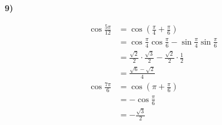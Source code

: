 \documentclass[11pt,a4paper,fleqn]{article}
\begin{document}
\textbf{9)}

\begin{align*}
  \cos\frac{5\pi}{12}
    &= \cos\left( \frac{\pi}{4} + \frac{\pi}{6} \right) \\[6pt]
    &= \cos\frac{\pi}{4}\cos\frac{\pi}{6} - \sin\frac{\pi}{4}\sin\frac{\pi}{6} \\[6pt]
    &= \frac{\sqrt{2}}{2} \cdot \frac{\sqrt{3}}{2} - \frac{\sqrt{2}}{2} \cdot \frac{1}{2} \\[6pt]
    &= \frac{\sqrt{6} - \sqrt{2}}{4} \\[14pt]
  \cos\frac{7\pi}{6}
    &= \cos\left( \pi + \frac{\pi}{6} \right) \\[6pt]
    &= -\cos\frac{\pi}{6} \\[6pt]
    &= -\frac{\sqrt{3}}{2}
\end{align*}
\end{document}
